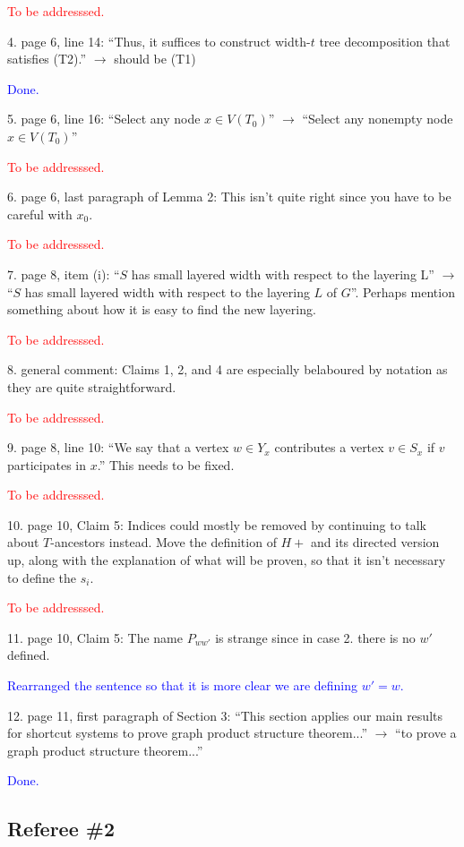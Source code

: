 \documentclass[12pt]{article}
\newcommand{\done}{\textcolor{blue}{Done.}}
\newcommand{\tba}{\textcolor{red}{To be addresssed.}}
\begin{document}
\tba

4. page 6, line 14: ``Thus, it suffices to construct width-$t$ tree decomposition that satisfies (T2).'' $\longrightarrow$ should be (T1)

\done

5. page 6, line 16: ``Select any node $x \in V (T_0)$'' $\longrightarrow$ ``Select any nonempty node $x \in V (T_0)$''

\tba

6. page 6, last paragraph of Lemma 2: This isn’t quite right since you
have to be careful with $x_0$.

\tba

7. page 8, item (i): ``$S$ has small layered width with respect to the layering
L'' $\longrightarrow$ ``$S$ has small layered width with respect to the layering $L$ of
$G$''. Perhaps mention something about how it is easy to find the new layering.

\tba

8. general comment: Claims 1, 2, and 4 are especially belaboured by
notation as they are quite straightforward.

\tba

9. page 8, line 10: ``We say that a vertex $w \in Y_x$ contributes a vertex
$v \in S_x$ if $v$ participates in $x$.'' This needs to be fixed.

\tba

10. page 10, Claim 5: Indices could mostly be removed by continuing
to talk about $T$-ancestors instead. Move the definition of $H+$ and its
directed version up, along with the explanation of what will be proven,
so that it isn’t necessary to define the $s_i$.

\tba

11. page 10, Claim 5: The name $P_{ww'}$ is strange since in case 2. there is
no $w'$ defined.

\textcolor{blue}{Rearranged the sentence so that it is more clear we are defining $w'=w$. }

12. page 11, first paragraph of Section 3: ``This section applies our main results for shortcut systems to prove graph product structure theorem...'' $\longrightarrow$ ``to prove a graph product structure theorem...''

\done

\subsection*{Referee \#2}
\end{document}

